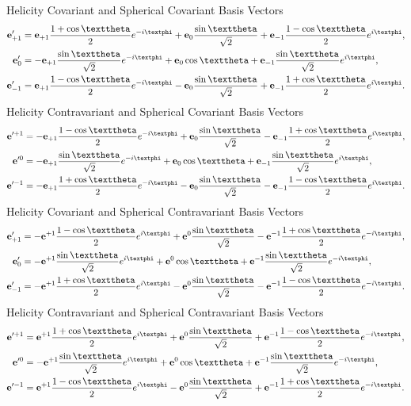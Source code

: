Helicity Covariant and Spherical Covariant Basis Vectors
\begin{align}
\vect{e}_{+1}^{\prime} & =\vect{e}_{+1} \frac{1+\cos \vartheta}{2} e^{-i \varphi}+\vect{e}_{0} \frac{\sin \vartheta}{\sqrt{2}}+\vect{e}_{-1} \frac{1-\cos \vartheta}{2} e^{i \varphi},  \notag\\
\vect{e}_{0}^{\prime} & =-\vect{e}_{+1} \frac{\sin \vartheta}{\sqrt{2}} e^{-i \varphi}+\vect{e}_{0} \cos \vartheta+\vect{e}_{-1} \frac{\sin \vartheta}{\sqrt{2}} e^{i \varphi},  \label{eq:1:1:49}\\
\vect{e}_{-1}^{\prime} & =\vect{e}_{+1} \frac{1-\cos \vartheta}{2} e^{-i \varphi}-\vect{e}_{0} \frac{\sin \vartheta}{\sqrt{2}}+\vect{e}_{-1} \frac{1+\cos \vartheta}{2} e^{i \varphi} . \notag
\end{align}
Helicity Contravariant and Spherical Covariant Basis Vectors
\begin{align}
\vect{e}^{\prime+1} & =-\vect{e}_{+1} \frac{1-\cos \vartheta}{2} e^{-i \varphi}+\vect{e}_{0} \frac{\sin \vartheta}{\sqrt{2}}-\vect{e}_{-1} \frac{1+\cos \vartheta}{2} e^{i \varphi},  \notag\\
\vect{e}^{\prime 0} & =-\vect{e}_{+1} \frac{\sin \vartheta}{\sqrt{2}} e^{-i \varphi}+\vect{e}_{0} \cos \vartheta+\vect{e}_{-1} \frac{\sin \vartheta}{\sqrt{2}} e^{i \varphi},  \label{eq:1:1:50}\\
\vect{e}^{\prime-1} & =-\vect{e}_{+1} \frac{1+\cos \vartheta}{2} e^{-i \varphi}-\vect{e}_{0} \frac{\sin \vartheta}{\sqrt{2}}-\vect{e}_{-1} \frac{1-\cos \vartheta}{2} e^{i \varphi} . \notag
\end{align}
Helicity Covariant and Spherical Contravariant Basis Vectors
\begin{align}
\vect{e}_{+1}^{\prime} & =-\vect{e}^{+1} \frac{1-\cos \vartheta}{2} e^{i \varphi}+\vect{e}^{0} \frac{\sin \vartheta}{\sqrt{2}}-\vect{e}^{-1} \frac{1+\cos \vartheta}{2} e^{-i \varphi},  \notag\\
\vect{e}_{0}^{\prime} & =-\vect{e}^{+1} \frac{\sin \vartheta}{\sqrt{2}} e^{i \varphi}+\vect{e}^{0} \cos \vartheta+\vect{e}^{-1} \frac{\sin \vartheta}{\sqrt{2}} e^{-i \varphi},  \label{eq:1:1:51}\\
\vect{e}_{-1}^{\prime} & =-\vect{e}^{+1} \frac{1+\cos \vartheta}{2} e^{i \varphi}-\vect{e}^{0} \frac{\sin \vartheta}{\sqrt{2}}-\vect{e}^{-1} \frac{1-\cos \vartheta}{2} e^{-i \varphi} . \notag
\end{align}
Helicity Contravariant and Spherical Contravariant Basis Vectors
\begin{align}
\vect{e}^{\prime+1} & =\vect{e}^{+1} \frac{1+\cos \vartheta}{2} e^{i \varphi}+\vect{e}^{0} \frac{\sin \vartheta}{\sqrt{2}}+\vect{e}^{-1} \frac{1-\cos \vartheta}{2} e^{-i \varphi},  \notag\\
\vect{e}^{\prime 0} & =-\vect{e}^{+1} \frac{\sin \vartheta}{\sqrt{2}} e^{i \varphi}+\vect{e}^{0} \cos \vartheta+\vect{e}^{-1} \frac{\sin \vartheta}{\sqrt{2}} e^{-i \varphi},  \label{eq:1:1:52}\\
\vect{e}^{\prime-1} & =\vect{e}^{+1} \frac{1-\cos \vartheta}{2} e^{i \varphi}-\vect{e}^{0} \frac{\sin \vartheta}{\sqrt{2}}+\vect{e}^{-1} \frac{1+\cos \vartheta}{2} e^{-i \varphi} . \notag
\end{align}
